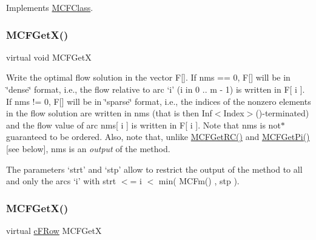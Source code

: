 Implements \mbox{\hyperlink{class_m_c_f_class_a7c103b582c910ccfda354032aae5722e}{M\+C\+F\+Class}}.

\mbox{\label{class_m_c_f_simplex_a884f1180138ddf3df909347b1c85428c}} 
\subsubsection{\texorpdfstring{M\+C\+F\+Get\+X()}{MCFGetX()}\hspace{0.1cm}{\footnotesize\ttfamily [1/3]}}
{\footnotesize\ttfamily virtual void M\+C\+F\+GetX}

Write the optimal flow solution in the vector F\mbox{[}\mbox{]}. If nms == 0, F\mbox{[}\mbox{]} will be in \char`\"{}dense\char`\"{} format, i.\+e., the flow relative to arc `i' (i in 0 .. m -\/ 1) is written in F\mbox{[} i \mbox{]}. If nms != 0, F\mbox{[}\mbox{]} will be in \char`\"{}sparse\char`\"{} format, i.\+e., the indices of the nonzero elements in the flow solution are written in nms (that is then Inf$<$\+Index$>$()-\/terminated) and the flow value of arc nms\mbox{[} i \mbox{]} is written in F\mbox{[} i \mbox{]}. Note that nms is not$\ast$ guaranteed to be ordered. Also, note that, unlike \mbox{\hyperlink{class_m_c_f_class_af027cee8179a876a4879c73820c380d1}{M\+C\+F\+Get\+R\+C()}} and \mbox{\hyperlink{class_m_c_f_class_a8f1a95d5c707f83ffc6aecba1e7e0e10}{M\+C\+F\+Get\+Pi()}} \mbox{[}see below\mbox{]}, nms is an {\itshape output} of the method.

The parameters `strt' and `stp' allow to restrict the output of the method to all and only the arcs `i' with strt $<$= i $<$ min( M\+C\+Fm() , stp ). \mbox{\label{class_m_c_f_simplex_a4eb307e0707adaef99bb0e08c9e10eb8}} 
\subsubsection{\texorpdfstring{M\+C\+F\+Get\+X()}{MCFGetX()}\hspace{0.1cm}{\footnotesize\ttfamily [2/3]}}
{\footnotesize\ttfamily virtual \mbox{\hyperlink{class_m_c_f_class_ad325f3193dbba0ddef1da4e72d29eda6}{c\+F\+Row}} M\+C\+F\+GetX\hspace{0.3cm}{\ttfamily [inline]}}


